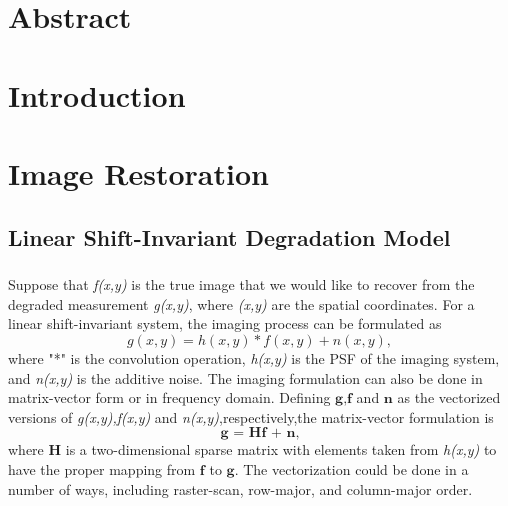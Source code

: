 \documentclass[a4paper]{book}
\begin{document}
	\captionsetup{justification=centering}
	
\frontmatter
%
\chapter{Abstract}
\tableofcontents
\listoffigures

\mainmatter
	\chapter{Introduction}
	\thispagestyle{empty}
	\chapter{Image Restoration}
	\thispagestyle{empty}

	\section{\Large Linear Shift-Invariant Degradation Model}
	
	\paragraph*{}Suppose that \textit{f(x,y)} is the true image that we would like to recover from the degraded measurement \textit{g(x,y)}, where \textit{(x,y)} are the spatial coordinates. For a linear shift-invariant system, the imaging process can be formulated as 
	\begin{equation}
	\label{eq3.1}
	g(x,y) = h(x,y) * f(x,y) + n(x,y),
	\end{equation}
	where "*" is the convolution operation, \textit{h(x,y)} is the PSF of the imaging system, and \textit{n(x,y)} is the additive noise. The imaging formulation can also be done in matrix-vector form or in frequency domain. Defining $\textbf{g,f}$ and $\textbf{n}$ as the vectorized versions of \textit{g(x,y),f(x,y)} and \textit{n(x,y)},respectively,the matrix-vector formulation is
	\begin{equation}
	\label{eq3.2}
	\textbf{g = Hf + n,}
	\end{equation}
	where \textbf{H} is a two-dimensional sparse matrix with elements taken from \textit{h(x,y)} to have the proper mapping from $ \textbf{f} $ to $ \textbf{g} $. The vectorization could be done in a number of ways, including raster-scan, row-major, and column-major order.
\end{document}
